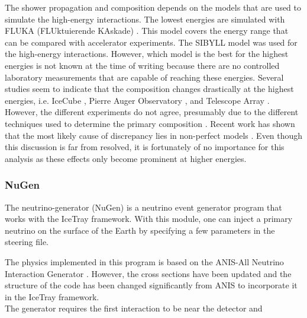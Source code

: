 \noindent The shower propagation and composition depends on the models that are used to simulate the high-energy interactions. The lowest energies are simulated with FLUKA  (FLUktuierende KAskade) \cite{Battistoni:2015epi}. This model covers the energy range that can be compared with accelerator experiments.  The SIBYLL model was used for the high-energy interactions. However, which model is the best for the highest energies is not known at the time of writing because there are no controlled laboratory measurements that are capable of reaching these energies. Several studies seem to indicate that the composition changes drastically at the highest energies, i.e. IceCube \cite{Rawlins:2016bkc}, Pierre Auger Observatory \cite{Porcelli:2015jli}, and Telescope Array \cite{Belz:2015cvi}. However, the different experiments do not agree, presumably due to the different techniques used to determine the primary composition \cite{samDeRidder}. Recent work has shown that the most likely cause of discrepancy lies in non-perfect models \cite{Dembinski:2019uta}. Even though this discussion is far from resolved, it is fortunately of no importance for this analysis as these effects only become prominent at higher energies.\\

\subsubsection{NuGen}
\label{subsec:nugen}
The neutrino-generator (NuGen) is a neutrino event generator program that works with the IceTray framework. With this module, one can inject a primary neutrino on the surface of the Earth by specifying a few parameters in the steering file.

The physics implemented in this program is based on the ANIS-All Neutrino Interaction Generator \cite{Gazizov:2004va}. However, the cross sections have been updated and the structure of the code has been changed significantly from ANIS to incorporate it in the IceTray framework.\\

\noindent The generator requires the first interaction to be near the detector and

